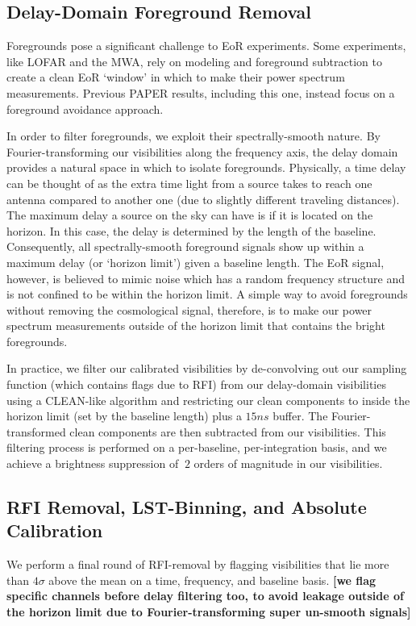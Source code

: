 \documentclass[preprint2,numberedappendix,tighten,twocolappendix]{aastex6}  %
\newcommand{\cc}[1]{{\color{purple} \textbf{[#1]}}}
\begin{document}
\subsection{Delay-Domain Foreground Removal}

Foregrounds pose a significant challenge to EoR experiments. Some experiments, like LOFAR and the MWA, rely on modeling and foreground subtraction to create a clean EoR `window' in which to make their power spectrum measurements. Previous PAPER results, including this one, instead focus on a foreground avoidance approach. 

In order to filter foregrounds, we exploit their spectrally-smooth nature. By Fourier-transforming our visibilities along the frequency axis, the delay domain provides a natural space in which to isolate foregrounds. Physically, a time delay can be thought of as the extra time light from a source takes to reach one antenna compared to another one (due to slightly different traveling distances). The maximum delay a source on the sky can have is if it is located on the horizon. In this case, the delay is determined by the length of the baseline. Consequently, all spectrally-smooth foreground signals show up within a maximum delay (or `horizon limit') given a baseline length. The EoR signal, however, is believed to mimic noise which has a random frequency structure and is not confined to be within the horizon limit. A simple way to avoid foregrounds without removing the cosmological signal, therefore, is to make our power spectrum measurements outside of the horizon limit that contains the bright foregrounds. 

In practice, we filter our calibrated visibilities by de-convolving out our sampling function (which contains flags due to RFI) from our delay-domain visibilities using a CLEAN-like algorithm and restricting our clean components to inside the horizon limit (set by the baseline length) plus a $15 ns$ buffer. The Fourier-transformed clean components are then subtracted from our visibilities. This filtering process is performed on a per-baseline, per-integration basis, and we achieve a brightness suppression of $~2$ orders of magnitude in our visibilities. 

\subsection{RFI Removal, LST-Binning, and Absolute Calibration}

We perform a final round of RFI-removal by flagging visibilities that lie more than $4\sigma$ above the mean on a time, frequency, and baseline basis. \cc{we flag specific channels before delay filtering too, to avoid leakage outside of the horizon limit due to Fourier-transforming super un-smooth signals}
\end{document}
